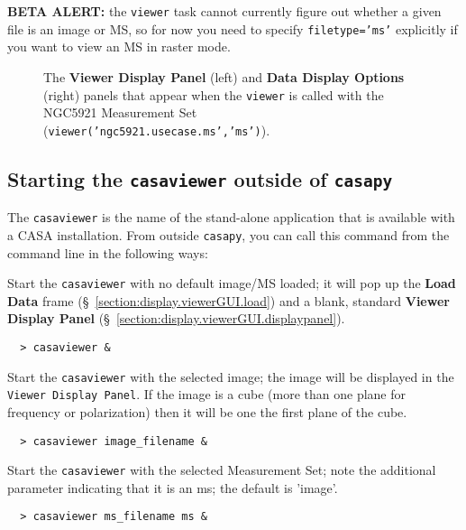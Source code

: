 {\bf BETA ALERT:} the {\tt viewer} task cannot currently figure out whether
a given file is an image or MS, so for now you need to specify 
{\tt filetype='ms'} explicitly if you want to view an MS in raster mode.

\begin{figure}[h!]
\begin{center}
\caption{\label{fig:viewer_start_ms} The {\bf Viewer Display Panel}
(left) and {\bf Data Display Options} (right) panels that appear when the 
{\tt viewer} is called with the NGC5921 Measurement Set
({\tt viewer('ngc5921.usecase.ms','ms')}).} 
\hrulefill
\end{center}
\end{figure}

\subsection{Starting the {\tt casaviewer} outside of {\tt casapy}}
\label{section:display.start.casaviewer}

The {\tt casaviewer} is the name of the stand-alone application that is
available with a CASA installation.  From outside {\tt casapy}, you
can call this command from the command line in the following ways:

Start the {\tt casaviewer} with no default image/MS loaded; it will
pop up the {\bf Load Data} frame 
(\S~\ref{section:display.viewerGUI.load}) and a blank, 
standard {\bf Viewer Display Panel} 
(\S~\ref{section:display.viewerGUI.displaypanel}).

\small
\begin{verbatim}
  > casaviewer &
\end{verbatim}
\normalsize

Start the {\tt casaviewer} with the selected image; the image will be
displayed in the {\tt Viewer Display Panel}. If the image is a cube (more
than one plane for frequency or polarization) then it will be one the
first plane of the cube.

\small
\begin{verbatim}
  > casaviewer image_filename &
\end{verbatim}
\normalsize

Start the {\tt casaviewer} with the selected Measurement Set; note the
additional parameter indicating that it is an ms; the default is
'image'.

\small
\begin{verbatim}
  > casaviewer ms_filename ms &
\end{verbatim}
\normalsize


